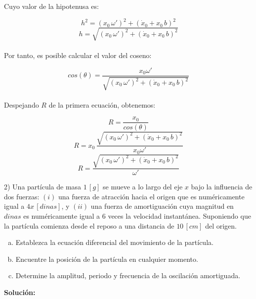 \documentclass[letter,11pt]{article}
\begin{document}
Cuyo valor de la hipotenusa es:

\begin{equation*}
    h^2 = (x_0\,\omega')^2 + (\dot{x}_0 + x_0\,b)^2
\end{equation*}
\begin{equation*}
    h = \sqrt{ (x_0\,\omega')^2 + (\dot{x}_0 + x_0\,b)^2 }
\end{equation*}
\\

Por tanto, es posible calcular el valor del coseno:

\begin{equation}
    cos(\theta) = \frac{x_0\omega'}{\sqrt{ (x_0\,\omega')^2 + (\dot{x}_0 + x_0\,b)^2 }}
\end{equation}
\\

Despejando $R$ de la primera ecuación, obtenemos:

\begin{equation*}
    R = \frac{x_0}{cos(\theta)}
\end{equation*}
\begin{equation*}
    R = x_0\,\frac{\sqrt{ (x_0\,\omega')^2 + (\dot{x}_0 + x_0\,b)^2 }}{x_0\omega'}
\end{equation*}
\begin{equation}
    R = \frac{\sqrt{ (x_0\,\omega')^2 + (\dot{x}_0 + x_0\,b)^2 }}{\omega'}
\end{equation}

\vspace{1.0cm}
2) Una partícula de masa $1\,[g]$ se mueve a lo largo del eje $x$ bajo la
influencia de dos fuerzas: $(i)$ una fuerza de atracción hacia el origen que es
numéricamente igual a $4x\,[dinas]$, y $(ii)$ una fuerza de amortiguación cuya
magnitud en $dinas$ es numéricamente igual a $6$ veces la velocidad instantánea.
Suponiendo que la partícula comienza desde el reposo a una distancia de
$10\,[cm]$ del origen.

\begin{enumerate}[a)]
    \item Establezca la ecuación diferencial del movimiento de la partícula.
    \item Encuentre la posición de la partícula en cualquier momento.
    \item Determine la amplitud, periodo y frecuencia de la oscilación
        amortiguada.
\end{enumerate}

\vspace{0.5cm}
\textbf{Solución:} \\
\end{document}
